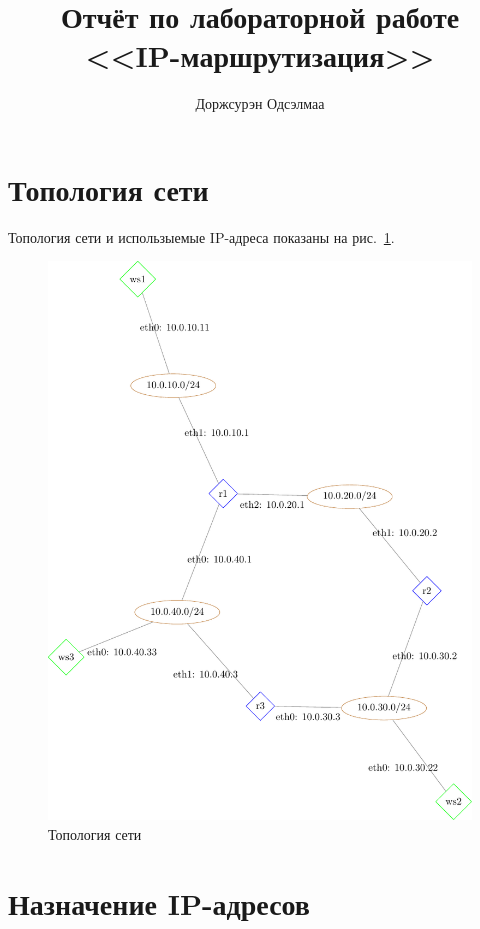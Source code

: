 \documentclass[a4paper,12pt]{article}
\title{Отчёт по лабораторной работе \\ <<IP-маршрутизация>>}
\author{Доржсурэн Одсэлмаа}
\begin{document}
\maketitle

\tableofcontents


\section{Топология сети}

Топология сети и использыемые IP-адреса показаны на рис.~\ref{fig:network}.

\begin{figure}
\centering
\includegraphics[width=\textwidth]{includes/network_gv.pdf}
\caption{Топология сети}
\label{fig:network}
\end{figure}


\section{Назначение IP-адресов}
\end{document}
